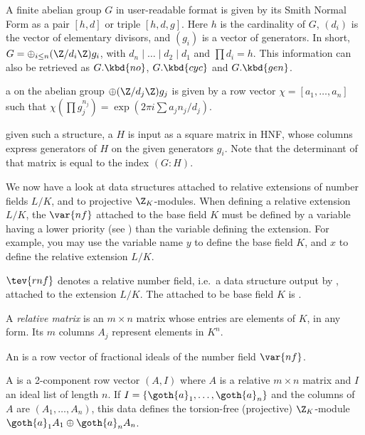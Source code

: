 
A finite abelian group $G$ in user-readable format is given by its Smith
Normal Form as a pair $[h,d]$ or triple $[h,d,g]$.
Here $h$ is the cardinality of $G$, $(d_i)$ is the vector of elementary
divisors, and $(g_i)$ is a vector of generators. In short,
$G = \oplus_{i\leq n} (\Z/d_i\Z) g_i$, with $d_n \mid \dots \mid d_2 \mid d_1$
and $\prod d_i = h$. This information can also be retrieved as
$G.\kbd{no}$, $G.\kbd{cyc}$ and $G.\kbd{gen}$.

\item a  on the abelian group
$\oplus (\Z/d_j\Z) g_j$
is given by a row vector $\chi = [a_1,\ldots,a_n]$ such that
$\chi(\prod g_j^{n_j}) = \exp(2\pi i\sum a_j n_j / d_j)$.

\item given such a structure, a  $H$ is input as a square
matrix in HNF, whose columns express generators of $H$ on the given generators
$g_i$. Note that the determinant of that matrix is equal to the index $(G:H)$.


We now have a look at data structures attached to relative extensions
of number fields $L/K$, and to projective $\Z_K$-modules. When defining a
relative extension $L/K$, the $\var{nf}$ attached to the base field $K$
must be defined by a variable having a lower priority (see
) than the variable defining the extension. For example,
you may use the variable name $y$ to define the base field $K$, and $x$ to
define the relative extension $L/K$.

\label{se:ZKmodules} %

\item $\tev{rnf}$ denotes a relative number field, i.e.~a data structure
output by , attached to the extension $L/K$. The 
attached to be base field $K$ is .

\item A \emph{relative matrix} is an $m\times n$ matrix whose entries are
elements of $K$, in any form. Its $m$ columns $A_j$ represent elements
in $K^n$.

\item An  is a row vector of fractional ideals of the number
field $\var{nf}$.

\item A  is a 2-component row vector $(A,I)$ where $A$
is a relative $m\times n$ matrix and $I$ an ideal list of length $n$. If $I =
\{\goth{a}_1,\dots, \goth{a}_n\}$ and the columns of $A$ are $(A_1,\dots,
A_n)$, this data defines the torsion-free (projective) $\Z_K$-module
$\goth{a}_1 A_1\oplus \goth{a}_n A_n$.

